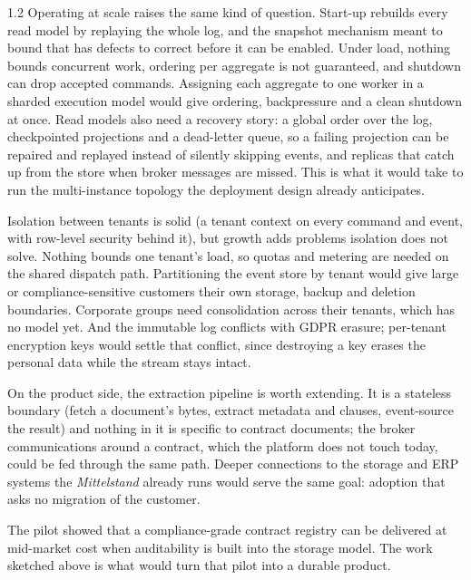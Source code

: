 \begin{spacing}{1.2}
Operating at scale raises the same kind of question. Start-up rebuilds
every read model by replaying the whole log, and the snapshot
mechanism meant to bound that has defects to correct before it can be
enabled. Under load, nothing bounds concurrent work, ordering per
aggregate is not guaranteed, and shutdown can drop accepted commands.
Assigning each aggregate to one worker in a sharded execution model
would give ordering, backpressure and a clean shutdown at once. Read
models also need a recovery story: a global order over the log,
checkpointed projections and a dead-letter queue, so a failing
projection can be repaired and replayed instead of silently skipping
events, and replicas that catch up from the store when broker messages
are missed. This is what it would take to run the multi-instance
topology the deployment design already anticipates.

Isolation between tenants is solid (a tenant context on every command
and event, with row-level security behind it), but growth adds
problems isolation does not solve. Nothing bounds one tenant's load,
so quotas and metering are needed on the shared dispatch path.
Partitioning the event store by tenant would give large or
compliance-sensitive customers their own storage, backup and deletion
boundaries. Corporate groups need consolidation across their tenants,
which has no model yet. And the immutable log conflicts with GDPR
erasure; per-tenant encryption keys would settle that conflict, since
destroying a key erases the personal data while the stream stays
intact.

On the product side, the extraction pipeline is worth extending. It is
a stateless boundary (fetch a document's bytes, extract metadata and
clauses, event-source the result) and nothing in it is specific to
contract documents; the broker communications around a contract, which
the platform does not touch today, could be fed through the same path.
Deeper connections to the storage and ERP systems the
\textit{Mittelstand} already runs would serve the same goal: adoption
that asks no migration of the customer.

The pilot showed that a compliance-grade contract registry can be
delivered at mid-market cost when auditability is built into the
storage model. The work sketched above is what would turn that pilot
into a durable product.

\end{spacing}
